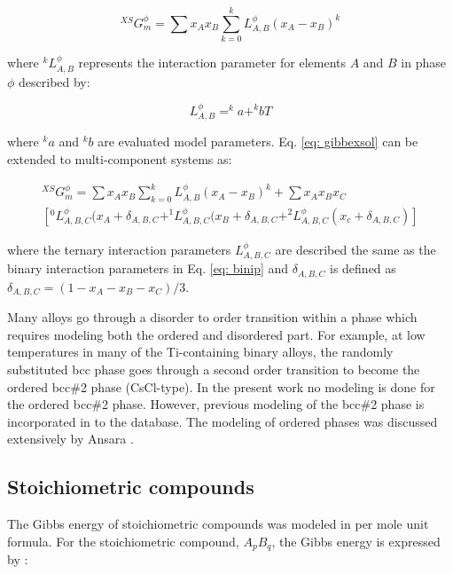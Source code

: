 \begin{equation}
\label{eq: gibbexsol}
^{XS}G_m^{\phi} = \sum x_{A} x_{B} \sum_{k=0} ^{k}L_{A,B}^{\phi} (x_{A} - x_{B})^k
\end{equation}

\noindent where $^kL_{A,B}^{\phi}$ represents the interaction parameter for elements $A$ and $B$ in phase $\phi$ described by:

\begin{equation}
\label{eq: binip}
L_{A,B}^{\phi} = ^{k}a + ^{k}bT
\end{equation}

\noindent where $^{k}a$ and $^{k}b$ are evaluated model parameters. Eq. \ref{eq: gibbexsol} can be extended to multi-component systems as:

\begin{multline}
\label{eq: gibbexsolmulti}
^{XS}G_m^{\phi} = \sum x_{A} x_{B} \sum_{k=0} ^{k}L_{A,B}^{\phi} (x_{A} - x_{B})^k + \sum x_{A} x_{B} x_{C} \\ \left[ ^{0}L_{A, B, C}^{\phi} (x_{A} + \delta_{A, B, C} + ^{1}L_{A, B, C}^{\phi} (x_{B} + \delta_{A, B, C} + ^{2}L_{A, B, C}^{\phi} (x_{c} + \delta_{A, B, C} ) \right]
\end{multline}

\noindent where the ternary interaction parameters $L_{A, B, C}^{\phi}$ are described the same as the binary interaction parameters in Eq. \ref{eq: binip} and $\delta_{A, B, C}$ is defined as $\delta_{A, B, C} = ( 1 - x_{A} - x_{B} - x_{C})/3$.

Many alloys go through a disorder to order transition within a phase which requires modeling both the ordered and disordered part. For example, at low temperatures in many of the Ti-containing binary alloys, the randomly substituted bcc phase goes through a second order transition to become the ordered bcc\#2 phase (CsCl-type). In the present work no modeling is done for the ordered bcc\#2 phase. However, previous modeling of the bcc\#2 phase is incorporated in to the database. The modeling of ordered phases was discussed extensively by Ansara \cite{Ansara1998}. 

\subsection{Stoichiometric compounds}

The Gibbs energy of stoichiometric compounds was modeled in per mole unit formula. For the stoichiometric compound, $A_{p}B_{q}$, the Gibbs energy is expressed by \cite{Zacherl2012}: 

